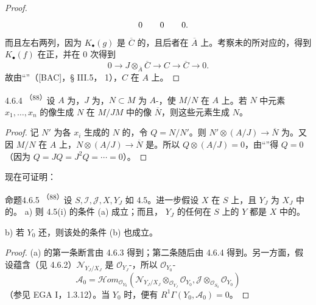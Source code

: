 \begin{proof}
\[\begin{tikzcd}[column sep=small,row sep=small]
&0&0&0.
\end{tikzcd}
\]
而且左右两列，因为 $K_\bullet(g)$ 是 $\overline C$ 的，且后者在 $\overline A$ 上。考察未的所对应的，得到 $K_\bullet(f)$ 在正，并在 $0$ 次得到
\[0\longrightarrow J\otimes_{\overline A}\overline C\longrightarrow C\longrightarrow\overline C\longrightarrow0.\]
故由“”（[BAC]，§ III.5， 1），$C$ 在 $A$ 上。
\end{proof}
\begin{SGAresult}{}{4.6.4}
\textsuperscript{（88）}设 $A$ 为，$J$ 为，$N\subset M$ 为 $A$-，使 $M/N$ 在 $A$ 上。若 $N$ 中元素 $x_1,\ldots,x_n$ 的像生成 $N$ 在 $M/JM$ 中的像 $\overline N$，则这些元素生成 $N$。
\end{SGAresult}
\begin{proof}
记 $N'$ 为各 $x_i$ 生成的 $N$ 的，令 $Q=N/N'$。则 $N'\otimes(A/J)\to\overline N$ 为。又因 $M/N$ 在 $A$ 上，$N\otimes(A/J)\to\overline N$ 是。所以 $Q\otimes(A/J)=0$，由“”得 $Q=0$（因为 $Q=JQ=J^2Q=\cdots=0$）。
\end{proof}
现在可证明：
\begin{SGAresult}{命题}{4.6.5}
\textsuperscript{（88）}设 $S,\mathscr I,\mathscr J,X,Y_J$ 如 4.5。进一步假设 $X$ 在 $S$ 上，且 $Y_J$ 为 $X_J$ 中的。
a) 则 4.5(i) 的条件 (a) 成立；而且， $Y_J$ 的任何在 $S$ 上的 $Y$ 都是 $X$ 中的。

b) 若 $Y_0$ 还，则该处的条件 (b) 也成立。
\end{SGAresult}
\begin{proof}
(a) 的第一条断言由 4.6.3 得到；第二条随后由 4.6.4 得到。另一方面，假设蕴含（见 4.6.2）$\mathscr N_{Y_J/X_J}$ 是 $\mathscr O_{Y_J}$-，所以 $\mathscr O_{Y_0}$-
\[\mathscr A_0=\mathscr Hom_{\mathscr O_{Y_0}}(\mathscr N_{Y_J/X_J}\otimes_{\mathscr O_{Y_J}}\mathscr O_{Y_0},\mathscr J\otimes_{\mathscr O_{S_0}}\mathscr O_{Y_0})\]
（参见 EGA I，1.3.12）。当 $Y_0$ 时，便有 $R^1\Gamma(Y_0,\mathscr A_0)=0$。
\end{proof}
